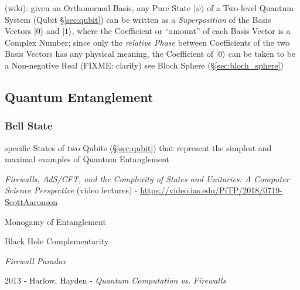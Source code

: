 (wiki): given an Orthonormal Basis, any Pure State $|\psi\rangle$ of a Two-level
Quantum System (Qubit \S\ref{sec:qubit}) can be written as a
\emph{Superposition} of the Basis Vectors $|0\rangle$ and $|1\rangle$, where the
Coefficient or ``amount'' of each Basis Vector is a Complex Number; since only
the \emph{relative Phase} between Coefficients of the two Basis Vectors has any
physical meaning, the Coefficient of $|0\rangle$ can be taken to be a
Non-negative Real (FIXME: clarify) \fist see Bloch Sphere
(\S\ref{sec:bloch_sphere})



\subsection{Quantum Entanglement}\label{sec:quantum_entanglement}

\subsubsection{Bell State}\label{sec:bell_state}

specific States of two Qubits (\S\ref{sec:qubit}) that represent the simplest
and maximal examples of Quantum Entanglement

\emph{Firewalls, AdS/CFT, and the Complexity of States and Unitaries: A Computer
  Science Perspective}
(video lectures)
-
\url{https://video.ias.edu/PiTP/2018/0719-ScottAaronson}

Monogamy of Entanglement

Black Hole Complementarity

\emph{Firewall Paradox}

2013 - Harlow, Hayden - \emph{Quantum Computation vs. Firewalls}

